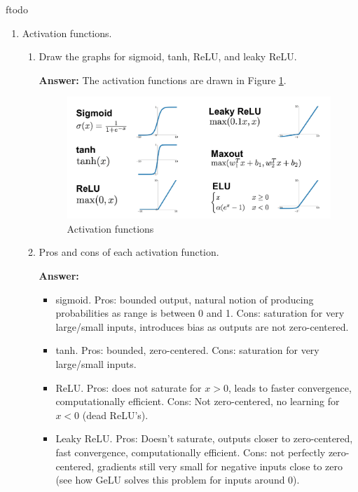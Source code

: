 ƒtodo\documentclass{article}
\newenvironment{QandA}{\begin{enumerate}[label=\arabic*.]}{\end{enumerate}}
\newenvironment{InnerQandA}{\begin{enumerate}[label=\roman*.]}{\end{enumerate}}
\newenvironment{answer}{\par\normalfont \textbf{Answer:}}{}
\begin{document}
\begin{QandA}
\begin{InnerQandA}
        \item Implement vanilla dropout for the forward and backward pass in NumPy.
        \begin{answer}
            The updated version of the gist with dropout can be found \href{https://gist.github.com/zaf-stojano/0cda51a7a1068d2936de3f1df2a47332}{here}. This time CoPilot needed a bit hand-holding, but is still very impressive.
        \end{answer}
    \end{InnerQandA}

    \item Activation functions.
    \begin{InnerQandA}
        \item Draw the graphs for sigmoid, tanh, ReLU, and leaky ReLU.
        \begin{answer}
            The activation functions are drawn in Figure \ref{fig:activation-functions}.
        \end{answer}
        \begin{figure}[h!]
                \centering
                \includegraphics[width=0.7\linewidth]{img/activation-functions.png}
                \caption{Activation functions}
                \label{fig:activation-functions}
            \end{figure}

        \item Pros and cons of each activation function.
        \begin{answer}
            \begin{itemize}
                \item sigmoid. Pros: bounded output, natural notion of producing probabilities as range is between 0 and 1. Cons: saturation for very large/small inputs, introduces bias as outputs are not zero-centered.
                \item tanh. Pros: bounded, zero-centered. Cons: saturation for very large/small inputs.
                \item ReLU. Pros: does not saturate for $x > 0$, leads to faster convergence, computationally efficient. Cons: Not zero-centered, no learning for $x < 0$ (dead ReLU's).
                \item Leaky ReLU. Pros: Doesn't saturate, outputs closer to zero-centered, fast convergence, computationally efficient. Cons: not perfectly zero-centered, gradients still very small for negative inputs close to zero (see how GeLU solves this problem for inputs around 0). 
            \end{itemize}
        \end{answer}


\end{InnerQandA}
\end{QandA}
\end{document}
